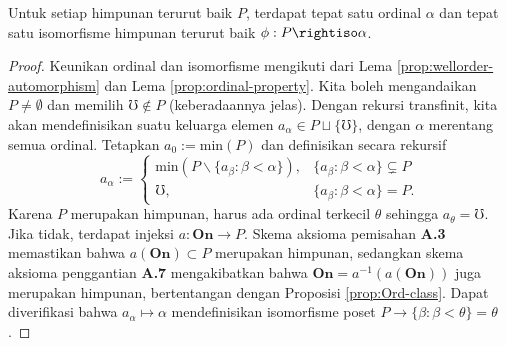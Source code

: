 \begin{proposition}\label{prop:ordinal-ordertype}
	Untuk setiap himpunan terurut baik $P$, terdapat tepat satu ordinal $\alpha$ dan tepat satu isomorfisme himpunan terurut baik $\phi: P \rightiso \alpha$.
\end{proposition}
\begin{proof}
	Keunikan ordinal dan isomorfisme mengikuti dari Lema \ref{prop:wellorder-automorphism} dan Lema \ref{prop:ordinal-property}. Kita boleh mengandaikan $P \neq \emptyset$ dan memilih $\mho \notin P$ (keberadaannya jelas). Dengan rekursi transfinit, kita akan mendefinisikan suatu keluarga elemen $a_\alpha \in P \sqcup \{\mho\}$, dengan $\alpha$ merentang semua ordinal. Tetapkan $a_0 := \text{min}(P)$ dan definisikan secara rekursif
	\[ a_\alpha := \begin{cases}
		\text{min}\left( P \smallsetminus \{a_\beta : \beta < \alpha \} \right), & \{a_\beta : \beta < \alpha \} \subsetneq P \\
		\mho, & \{a_\beta : \beta < \alpha \} = P.
	\end{cases}\]
	Karena $P$ merupakan himpunan, harus ada ordinal terkecil $\theta$ sehingga $a_\theta = \mho$. Jika tidak, terdapat injeksi $a: \textbf{On} \to P$. Skema aksioma pemisahan \textbf{A.3} memastikan bahwa $a(\textbf{On}) \subset P$ merupakan himpunan, sedangkan skema aksioma penggantian \textbf{A.7} mengakibatkan bahwa $\textbf{On} = a^{-1}(a(\textbf{On}))$ juga merupakan himpunan, bertentangan dengan Proposisi \ref{prop:Ord-class}. Dapat diverifikasi bahwa $a_\alpha \mapsto \alpha$ mendefinisikan isomorfisme poset $P \to \{\beta : \beta < \theta\} = \theta$.
\end{proof}


